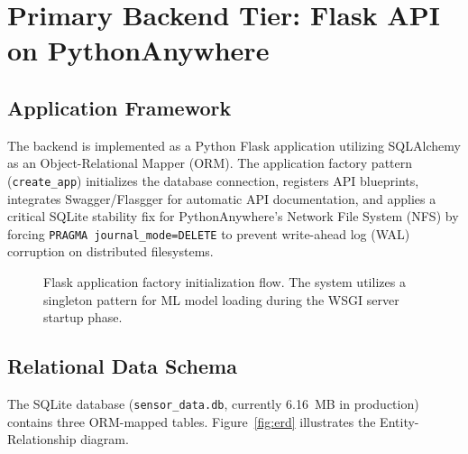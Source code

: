 \documentclass[12pt,a4paper]{article}
\begin{document}
\section{Primary Backend Tier: Flask API on PythonAnywhere}

\subsection{Application Framework}
The backend is implemented as a Python Flask application utilizing SQLAlchemy as an Object-Relational Mapper (ORM). The application factory pattern (\texttt{create\_app}) initializes the database connection, registers API blueprints, integrates Swagger/Flasgger for automatic API documentation, and applies a critical SQLite stability fix for PythonAnywhere's Network File System (NFS) by forcing \texttt{PRAGMA journal\_mode=DELETE} to prevent write-ahead log (WAL) corruption on distributed filesystems.

\begin{figure}[H]
\centering
{}
\caption{Flask application factory initialization flow. The system utilizes a singleton pattern for ML model loading during the WSGI server startup phase.}
\label{fig:app_factory}
\end{figure}

\subsection{Relational Data Schema}
The SQLite database (\texttt{sensor\_data.db}, currently 6.16~MB in production) contains three ORM-mapped tables. Figure~\ref{fig:erd} illustrates the Entity-Relationship diagram.
\end{document}
